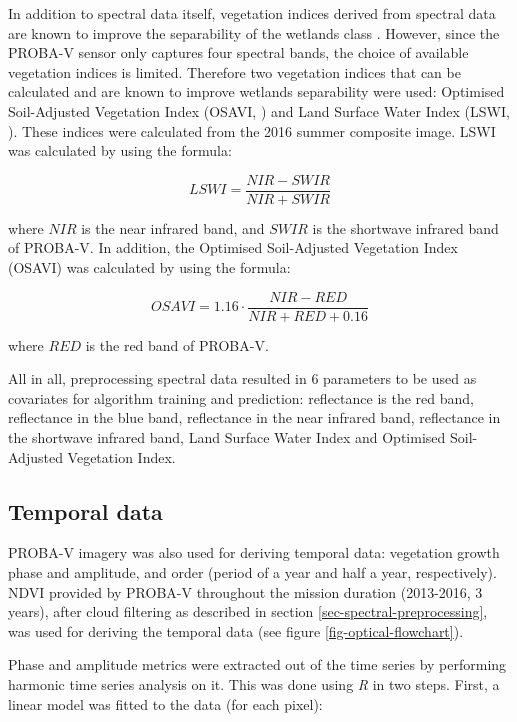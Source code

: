 \documentclass[a4paper,10pt]{book}
\begin{document}
In addition to spectral data itself, vegetation indices derived from spectral data are known to improve the separability of the wetlands class \citep{zhao2009indices,davranche2010wetland}. However, since the PROBA-V sensor only captures four spectral bands, the choice of available vegetation indices is limited. Therefore two vegetation indices that can be calculated and are known to improve wetlands separability were used: Optimised Soil-Adjusted Vegetation Index (OSAVI, \citealt{rondeaux1996osavi}) and Land Surface Water Index (LSWI, \citealt{xiao2004lswi, dong2014lswi}). These indices were calculated from the 2016 summer composite image. LSWI was calculated by using the formula:

$$ LSWI = \frac{NIR - SWIR}{NIR + SWIR} $$

where $NIR$ is the near infrared band, and $SWIR$ is the shortwave infrared band of PROBA-V. In addition, the Optimised Soil-Adjusted Vegetation Index (OSAVI) was calculated by using the formula:

$$ OSAVI = 1.16 \cdot{} \frac{NIR-RED}{NIR+RED+0.16} $$

where $RED$ is the red band of PROBA-V.

All in all, preprocessing spectral data resulted in 6 parameters to be used as covariates for algorithm training and prediction: reflectance is the red band, reflectance in the blue band, reflectance in the near infrared band, reflectance in the shortwave infrared band, Land Surface Water Index and Optimised Soil-Adjusted Vegetation Index.

\subsection{Temporal data}

PROBA-V imagery was also used for deriving temporal data: vegetation growth phase and amplitude,  and  order (period of a year and half a year, respectively). NDVI provided by PROBA-V throughout the mission duration (2013-2016, 3 years), after cloud filtering as described in section \ref{sec-spectral-preprocessing}, was used for deriving the temporal data (see figure \ref{fig-optical-flowchart}).

Phase and amplitude metrics were extracted out of the time series by performing harmonic time series analysis \citep{rayner1971introduction,jakubauskas2001harmonic} on it. This was done using \textit{R} in two steps. First, a linear model was fitted to the data (for each pixel):
\end{document}
